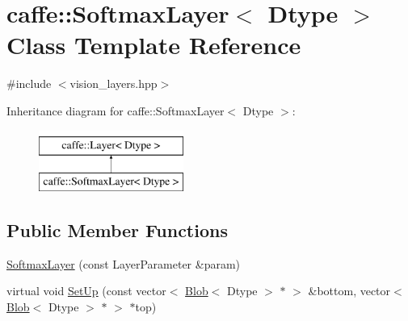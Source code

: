 \hypertarget{classcaffe_1_1_softmax_layer}{\section{caffe\+:\+:Softmax\+Layer$<$ Dtype $>$ Class Template Reference}
\label{classcaffe_1_1_softmax_layer}
}


{\ttfamily \#include $<$vision\+\_\+layers.\+hpp$>$}

Inheritance diagram for caffe\+:\+:Softmax\+Layer$<$ Dtype $>$\+:\begin{figure}[H]
\begin{center}
\leavevmode
\includegraphics[height=2.000000cm]{classcaffe_1_1_softmax_layer}
\end{center}
\end{figure}
\subsection*{Public Member Functions}
\begin{DoxyCompactItemize}
\item 
\hyperlink{classcaffe_1_1_softmax_layer_a6a3b60c74c2c48e8d5f65595ec1b4268}{Softmax\+Layer} (const Layer\+Parameter \&param)
\item 
virtual void \hyperlink{classcaffe_1_1_softmax_layer_ac6d690c48e66fa79f42938349e99a2e2}{Set\+Up} (const vector$<$ \hyperlink{classcaffe_1_1_blob}{Blob}$<$ Dtype $>$ $\ast$ $>$ \&bottom, vector$<$ \hyperlink{classcaffe_1_1_blob}{Blob}$<$ Dtype $>$ $\ast$ $>$ $\ast$top)
\end{DoxyCompactItemize}
